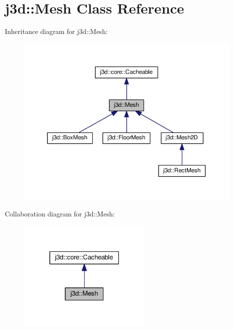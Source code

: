 \hypertarget{classj3d_1_1Mesh}{}\section{j3d\+:\+:Mesh Class Reference}
\label{classj3d_1_1Mesh}


Inheritance diagram for j3d\+:\+:Mesh\+:
\nopagebreak
\begin{figure}[H]
\begin{center}
\leavevmode
\includegraphics[width=350pt]{classj3d_1_1Mesh__inherit__graph}
\end{center}
\end{figure}


Collaboration diagram for j3d\+:\+:Mesh\+:
\nopagebreak
\begin{figure}[H]
\begin{center}
\leavevmode
\includegraphics[width=187pt]{classj3d_1_1Mesh__coll__graph}
\end{center}
\end{figure}
